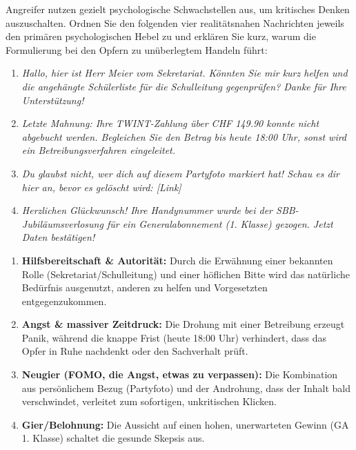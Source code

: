 \documentclass[12pt,a4paper]{article}
\begin{document}
\begin{taskbox}
Angreifer nutzen gezielt psychologische Schwachstellen aus, um kritisches Denken auszuschalten. Ordnen Sie den folgenden vier realitätsnahen Nachrichten jeweils den primären psychologischen Hebel zu und erklären Sie kurz, warum die Formulierung bei den Opfern zu unüberlegtem Handeln führt:
\begin{enumerate}[label=\alph*)]
    \item \textit{Hallo, hier ist Herr Meier vom Sekretariat. Könnten Sie mir kurz helfen und die angehängte Schülerliste für die Schulleitung gegenprüfen? Danke für Ihre Unterstützung!}
    \item \textit{Letzte Mahnung: Ihre TWINT-Zahlung über CHF 149.90 konnte nicht abgebucht werden. Begleichen Sie den Betrag bis heute 18:00 Uhr, sonst wird ein Betreibungsverfahren eingeleitet.}
    \item \textit{Du glaubst nicht, wer dich auf diesem Partyfoto markiert hat! Schau es dir hier an, bevor es gelöscht wird: [Link]}
    \item \textit{Herzlichen Glückwunsch! Ihre Handynummer wurde bei der SBB-Jubiläumsverlosung für ein Generalabonnement (1. Klasse) gezogen. Jetzt Daten bestätigen!}
\end{enumerate}
\end{taskbox}

\begin{solutionbox}
\begin{enumerate}[label=\alph*)]
    \item \textbf{Hilfsbereitschaft \& Autorität:} Durch die Erwähnung einer bekannten Rolle (Sekretariat/Schulleitung) und einer höflichen Bitte wird das natürliche Bedürfnis ausgenutzt, anderen zu helfen und Vorgesetzten entgegenzukommen.
    \item \textbf{Angst \& massiver Zeitdruck:} Die Drohung mit einer Betreibung erzeugt Panik, während die knappe Frist (heute 18:00 Uhr) verhindert, dass das Opfer in Ruhe nachdenkt oder den Sachverhalt prüft.
    \item \textbf{Neugier (FOMO, die Angst, etwas zu verpassen):} Die Kombination aus persönlichem Bezug (Partyfoto) und der Androhung, dass der Inhalt bald verschwindet, verleitet zum sofortigen, unkritischen Klicken.
    \item \textbf{Gier/Belohnung:} Die Aussicht auf einen hohen, unerwarteten Gewinn (GA 1. Klasse) schaltet die gesunde Skepsis aus.
\end{enumerate}
\end{solutionbox}
\end{document}
